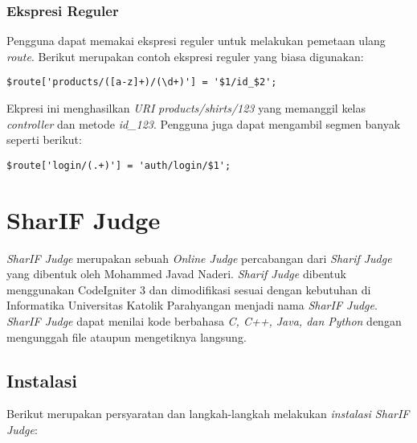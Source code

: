 \subsubsection{Ekspresi Reguler}

Pengguna dapat memakai ekspresi reguler untuk melakukan pemetaan ulang \textit{route}. Berikut merupakan contoh ekspresi reguler yang biasa digunakan:

\begin{center}
\verb|$route['products/([a-z]+)/(\d+)'] = '$1/id_$2';|
\end{center}

Ekpresi ini menghasilkan \textit{URI} \textit{products/shirts/123} yang memanggil kelas \textit{controller} dan metode \textit{id\_123}. Pengguna juga dapat mengambil segmen banyak seperti berikut:
\begin{center}
\verb|$route['login/(.+)'] = 'auth/login/$1';|
\end{center}

\section{SharIF Judge\cite{sharif:23}}
\label{sec:judge}

\textit{SharIF Judge} merupakan sebuah \textit{Online Judge} percabangan dari \textit{Sharif Judge} yang dibentuk oleh Mohammed Javad Naderi. \textit{Sharif Judge} dibentuk menggunakan CodeIgniter 3 dan dimodifikasi sesuai dengan kebutuhan di Informatika Universitas Katolik Parahyangan menjadi nama \textit{SharIF Judge}. \textit{SharIF Judge} dapat menilai kode berbahasa \textit{C, C++, Java, dan Python} dengan mengunggah file ataupun mengetiknya langsung.

\subsection{Instalasi}
\label{subsec:instalasi}

Berikut merupakan persyaratan dan langkah-langkah melakukan \textit{instalasi SharIF Judge}:

